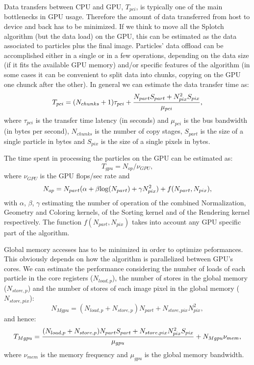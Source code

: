 \documentclass[11pt]{article}
\begin{document}
Data transfers between CPU and GPU, $T_{pci}$, is typically one of the main 
bottlenecks in GPU usage. Therefore the amount of data transferred from host
to device and back has to be minimized. If we think to move all the Splotch
algorithm (but the data load) on the GPU, this can be estimated
as the data associated to particles plus the final image. Particles' data
offload can be accomplished either in a single or in a few operations, 
depending on the data size (if it fits the available GPU memory) and/or
specific features of the algorithm (in some cases it can be convenient to
split data into chunks, copying on the GPU one chunck after the other).
In general we can estimate the data transfer time as:
\begin{equation}
T_{pci} =  (N_{chunks}+1) \tau_{pci} + {N_{part} S_{part} + N_{pix}^2 S_{pix} \over 
\mu_{pci}},
\end{equation}
where $\tau_{pci}$ is the transfer time latency (in seconds) and $\mu_{pci}$ is the
bus bandwidth (in bytes per second), $N_{chunks}$ is the number 
of copy stages, $S_{part}$ is the size of a single particle in bytes and 
$S_{pix}$ is the size of a single pixels in bytes. 

The time spent in processing the particles on the GPU can be estimated as:
\begin{equation}
T_{gpu} = N_{op}/\nu_{GPU},
\end{equation}
where $\nu_{GPU}$ is the GPU flops/sec rate and
\begin{equation}
N_{op} = N_{part}(\alpha + \beta {\rm log}(N_{part}) + \gamma N_{pix}^2) + f(N_{part},N_{pix}),
\end{equation}
with $\alpha$, $\beta$, $\gamma$ estimating the number of operation of 
the combined Normalization, Geometry and Coloring kernels, of the 
Sorting kernel and of the Rendering kernel respectively. The function 
$f(N_{part},N_{pix})$ takes into account any GPU specific part of the algorithm. 

Global memory accesses has to be minimized in 
order to optimize peformances. This obviously depends on how
the algorithm is parallelized between GPU's cores. We can estimate
the performance considering the number of loads of each particle in 
the core registers ($N_{load,p}$), the number of stores in the global memory 
($N_{store,p}$) and the number
of stores of each image pixel in the global memory ($N_{store,pix}$):
\begin{equation}
N_{Mgpu} = (N_{load,p} + N_{store,p}) N_{part} + N_{store,pix} N_{pix}^2,
\end{equation}
and hence:
\begin{equation}
T_{Mgpu} = {(N_{load,p} + N_{store,p}) N_{part} S_{part} 
+ N_{store,pix} N_{pix}^2 S_{pix} \over \mu_{gpu}}
+ N_{Mgpu} \nu_{mem},
\end{equation}
where $\nu_{mem}$ is the memory frequency and $\mu_{gpu}$ is the global memory bandwidth.
\end{document}
